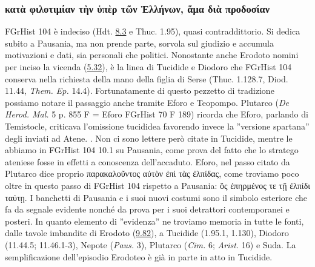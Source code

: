 {        \subsubsection{\textgreek{κατὰ φιλοτιμίαν τὴν ὑπὲρ τῶν Ἑλλήνων, ἅμα διὰ προδοσίαν}}
        FGrHist 104 è indeciso (Hdt. \href{http://data.perseus.org/citations/urn:cts:greekLit:tlg0016.tlg001.perseus-grc1:8.3}{8.3} e Thuc. 1.95), quasi contraddittorio. Si dedica subito a Pausania, ma non prende parte, sorvola sul giudizio e accumula motivazioni e dati, sia personali che politici. Nonostante anche Erodoto nomini per inciso la vicenda (\href{http://data.perseus.org/citations/urn:cts:greekLit:tlg0016.tlg001.perseus-grc1:5.32}{5.32}), è la linea di Tucidide e  Diodoro che FGrHist 104 conserva nella richiesta della mano della figlia di Serse \label{ref:figliadiSerse} (Thuc. 1.128.7, Diod. 11.44, \emph{Them. Ep.}  14.4). Fortunatamente di questo pezzetto di tradizione possiamo notare il passaggio anche tramite Eforo e Teopompo. Plutarco (\emph{De Herod. Mal.} 5 p. 855 F = Eforo FGrHist 70 F 189) ricorda che Eforo, parlando di Temistocle, criticava l'omissione tucididea favorendo invece la ''versione spartana'' degli inviati ad Atene. \cite[402-3]{Parmeggiani2011}. Non ci sono lettere però citate in Tucidide, mentre le abbiamo in FGrHist 104 10.1 su Pausania, come prova del fatto che lo stratego ateniese fosse in effetti a conoscenza dell'accaduto. Eforo, nel passo citato da Plutarco dice proprio \textgreek{παρακαλοῦντος αὐτὸν ἐπὶ τὰς  ἐλπίδας}, come troviamo poco oltre in questo passo di FGrHist 104 rispetto a Pausania: \textgreek{ὃς ἐπηρμένος τε τῇ ἐλπίδι ταύτῃ.} 
            I banchetti di Pausania  e i suoi nuovi costumi sono il simbolo esteriore che fa da segnale evidente nonché da prova per i suoi detrattori contemporanei e posteri. In quanto elemento di ''evidenza'' ne troviamo memoria in tutte le fonti, dalle tavole imbandite di Erodoto (\href{http://data.perseus.org/citations/urn:cts:greekLit:tlg0016.tlg001.perseus-grc1:9.82}{9.82}), a Tucidide (1.95.1, 1.130),  Diodoro (11.44.5; 11.46.1-3),  Nepote (\emph{Paus.} 3), Plutarco (\emph{Cim.} 6; \emph{Arist.} 16) e Suda. La semplificazione dell'episodio Erodoteo è già in parte in atto in Tucidide.
}
